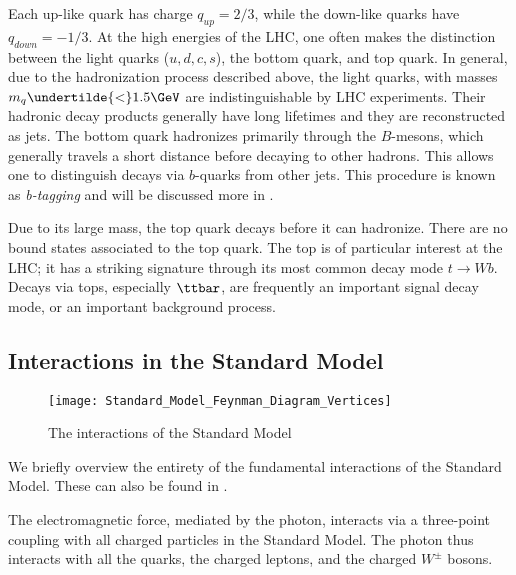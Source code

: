 Each up-like quark has charge $q_{up} = 2/3$, while the down-like quarks have $q_{down} = -1/3$.
At the high energies of the LHC, one often makes the distinction between the light quarks ($u,d,c,s$), the bottom quark, and top quark.
In general, due to the hadronization process described above, the light quarks, with masses $m_q \undertilde{<} 1.5 \GeV$ are indistinguishable by LHC experiments.
Their hadronic decay products generally have long lifetimes and they are reconstructed as jets\footnotemark.
The bottom quark hadronizes primarily through the $B$-mesons, which generally travels a short distance before decaying to other hadrons.
This allows one to distinguish decays via $b$-quarks from other jets.
This procedure is known as \textit{b-tagging} and will be discussed more in .

Due to its large mass, the top quark decays before it can hadronize.
There are no bound states associated to the top quark.
The top is of particular interest at the LHC; it has a striking signature through its most common decay mode $t \rightarrow Wb$.
Decays via tops, especially $\ttbar$, are frequently an important signal decay mode, or an important background process.

\subsection{Interactions in the Standard Model}
\begin{figure}[tbp]
\caption{The interactions of the Standard Model} \label{fig:sm_interactions}
\texttt{[image: Standard\_Model\_Feynman\_Diagram\_Vertices]}
\end{figure}

We briefly overview the entirety of the fundamental interactions of the Standard Model.
These can also be found in .

The electromagnetic force, mediated by the photon, interacts via a three-point coupling with all charged particles in the Standard Model.
The photon thus interacts with all the quarks, the charged leptons, and the charged $W^\pm$ bosons.

